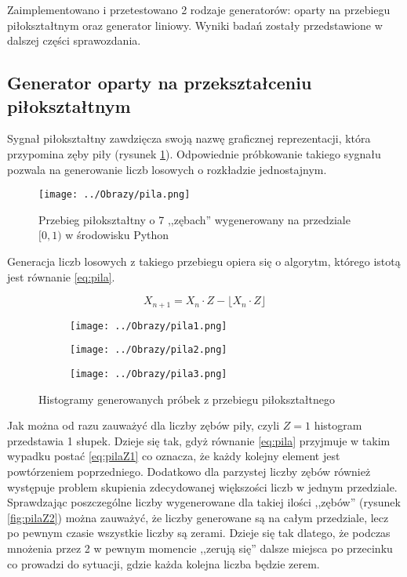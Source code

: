 \documentclass[12pt,a4paper]{article}
\begin{document}
Zaimplementowano i przetestowano 2 rodzaje generatorów: oparty na przebiegu piłokształtnym oraz generator liniowy. 
Wyniki badań zostały przedstawione w dalszej części sprawozdania.

\subsection{Generator oparty na przekształceniu piłokształtnym}
Sygnał piłokształtny zawdzięcza swoją nazwę graficznej reprezentacji, która przypomina zęby piły (rysunek \ref{fig:pila}). Odpowiednie próbkowanie takiego sygnału pozwala na generowanie liczb losowych o rozkładzie jednostajnym.
\begin{figure}[!h]
\centering
\texttt{[image: ../Obrazy/pila.png]} 
\caption{Przebieg piłokształtny o 7 ,,zębach'' wygenerowany na przedziale $[0,1)$ w środowisku Python}
\label{fig:pila}
\end{figure}

Generacja liczb losowych z takiego przebiegu opiera się o algorytm, którego istotą jest równanie \ref{eq:pila}. 


\begin{equation}\label{eq:pila}
X_{n+1} = X_{n} \cdot Z - \lfloor X_{n} \cdot Z \rfloor
\end{equation}

\begin{figure}[H]
\centering
\begin{subfigure}{\textwidth}
\texttt{[image: ../Obrazy/pila1.png]} 
\end{subfigure}
\begin{subfigure}{\textwidth}
\texttt{[image: ../Obrazy/pila2.png]} 
\end{subfigure}
\begin{subfigure}{\textwidth}
\texttt{[image: ../Obrazy/pila3.png]} 
\end{subfigure}
\caption{Histogramy generowanych próbek z przebiegu piłokształtnego}
\label{fig:pila1}
\end{figure}

Jak można od razu zauważyć dla liczby zębów piły, czyli $Z=1$ histogram przedstawia 1 słupek.
Dzieje się tak, gdyż równanie \ref{eq:pila} przyjmuje w takim wypadku postać \ref{eq:pilaZ1} co oznacza, że każdy kolejny element jest powtórzeniem poprzedniego.
Dodatkowo dla parzystej liczby zębów również występuje problem skupienia zdecydowanej większości liczb w jednym przedziale.
Sprawdzając poszczególne liczby wygenerowane dla takiej ilości ,,zębów'' (rysunek \ref{fig:pilaZ2}) można zauważyć, że liczby generowane są na całym przedziale, lecz po pewnym czasie wszystkie liczby są zerami. Dzieje się tak dlatego, że podczas mnożenia przez 2 w pewnym momencie ,,zerują się'' dalsze miejsca po przecinku co prowadzi do sytuacji, gdzie każda kolejna liczba będzie zerem.
\end{document}
